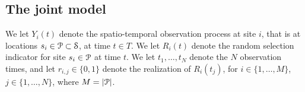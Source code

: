 \subsection{The joint model}
We let $Y_i(t)$ denote the spatio-temporal observation process at site $i$, that is at locations 
$s_i \in \mathcal{P} \subset \mathcal{S}$, at time $t \in T$. We let $R_i(t)$ denote the random selection 
indicator for site $s_i \in \mathcal{P}$ at time $t$. We let $t_1, \ldots, t_N$ denote the $N$ observation
times, and let $r_{i, j} \in \{0, 1\}$ denote the realization of $R_i(t_j)$, for $i \in \{1, \ldots, M\}$,
$j \in \{1, \ldots, N\}$, where $M = |\mathcal{P}|$. 
%
